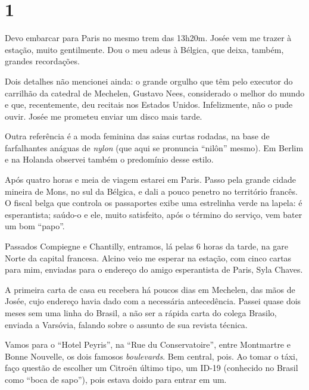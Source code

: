 \section*{1 \adfflatleafright {}}

Devo embarcar para Paris no mesmo trem das 13h20m. Josée vem me trazer à estação, muito gentilmente. Dou o meu adeus à Bélgica, que deixa, também, grandes recordações.

Dois detalhes não mencionei ainda: o grande orgulho que têm pelo executor do carrilhão da catedral de Mechelen, Gustavo Nees, considerado o melhor do mundo e que, recentemente, deu recitais nos Estados Unidos. Infelizmente, não o pude ouvir. Josée me prometeu enviar um disco mais tarde.

Outra referência é a moda feminina das saias curtas rodadas, na base de farfalhantes anáguas de \textit{nylon} (que aqui se pronuncia ``nilôn'' mesmo). Em Berlim e na Holanda observei também o predomínio desse estilo.

Após quatro horas e meia de viagem estarei em Paris. Passo pela grande cidade mineira de Mons, no sul da Bélgica, e dali a pouco penetro no território francês. O fiscal belga que controla os passaportes exibe uma estrelinha verde na lapela: é esperantista; saúdo-o e ele, muito satisfeito, após o término do serviço, vem bater um bom ``papo''.

Passados Compiegne e Chantilly, entramos, lá pelas 6 horas da tarde, na gare Norte da capital francesa. Alcino veio me esperar na estação, com cinco cartas para mim, enviadas para o endereço do amigo esperantista de Paris, Syla Chaves.

A primeira carta de casa eu recebera há poucos dias em Mechelen, das mãos de Josée, cujo endereço havia dado com a necessária antecedência. Passei quase dois meses sem uma linha do Brasil, a não ser a rápida carta do colega Brasilo, enviada a Varsóvia, falando sobre o assunto de sua revista técnica.

Vamos para o ``Hotel Peyris'', na ``Rue du Conservatoire'', entre Montmartre e Bonne Nouvelle, os dois famosos \textit{boulevards}. Bem central, pois. Ao tomar o táxi, faço questão de escolher um Citroën último tipo, um ID-19 (conhecido no Brasil como ``boca de sapo''), pois estava doido para entrar em um.

